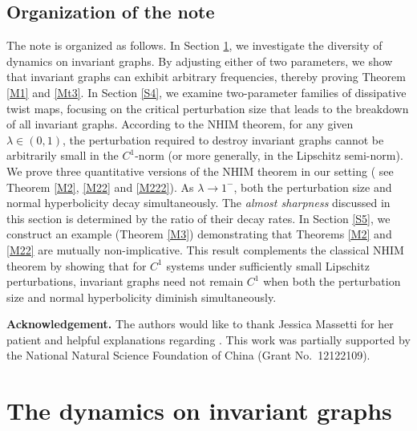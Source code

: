 \documentclass{amsart}
\theoremstyle{definition}
\begin{document}
\subsection*{Organization of the note}
The note is organized as follows. In Section \ref{S3}, we investigate the diversity of dynamics on invariant graphs. By adjusting either of two parameters, we show that invariant graphs can exhibit arbitrary frequencies, thereby proving Theorem \ref{M1} and \ref{Mt3}.
In Section \ref{S4}, we examine two-parameter families of dissipative twist maps, focusing on the critical perturbation size that leads to the breakdown of all invariant graphs. According to the NHIM theorem, for any given $\lambda \in (0,1)$, the perturbation required to destroy invariant graphs cannot be arbitrarily small in the $C^1$-norm (or more generally, in the Lipschitz semi-norm). We prove three quantitative versions of the NHIM theorem in our setting ( see Theorem \ref{M2}, \ref{M22} and \ref{M222}). As $\lambda \to 1^-$, both the perturbation size and normal hyperbolicity decay simultaneously. The {\it almost sharpness} discussed in this section is determined by the ratio of their decay rates.
In Section \ref{S5}, we construct an example (Theorem \ref{M3})  demonstrating that Theorems \ref{M2} and \ref{M22} are mutually non-implicative. This result complements the classical NHIM theorem by showing that for $C^1$ systems under sufficiently small Lipschitz perturbations, invariant graphs need not remain $C^1$ when both the perturbation size and normal hyperbolicity diminish simultaneously.





	 \vspace{2em}

 \noindent\textbf{Acknowledgement.}
The authors would like to thank Jessica Massetti for her patient and helpful explanations regarding \cite{Ma}. This work was partially supported by the National Natural Science Foundation of China (Grant No.~12122109).

	
	
	
	 \vspace{2em}

		
%



\section{\sc The dynamics on invariant graphs}\label{S3}
\end{document}
